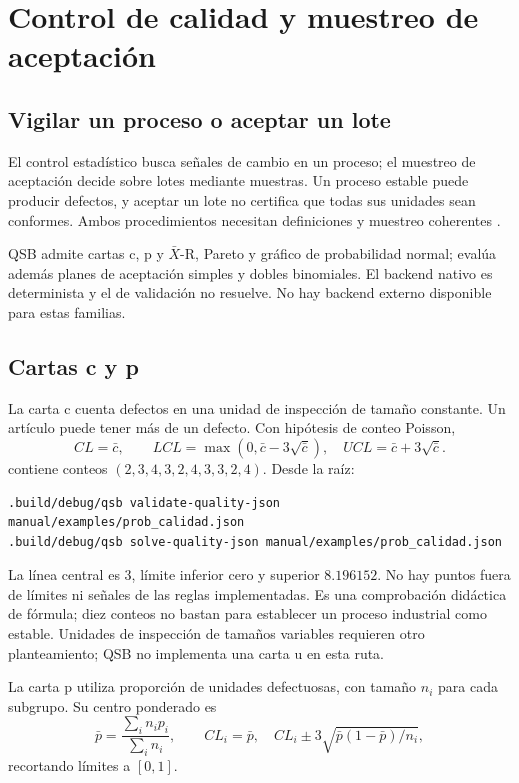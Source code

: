 \chapter{Control de calidad y muestreo de aceptación}
\label{ch:calidad}

\section{Vigilar un proceso o aceptar un lote}
El control estadístico busca señales de cambio en un proceso; el muestreo de
aceptación decide sobre lotes mediante muestras. Un proceso estable puede
producir defectos, y aceptar un lote no certifica que todas sus unidades sean
conformes. Ambos procedimientos necesitan definiciones y muestreo coherentes
\cite{montgomery2020quality}.

QSB admite cartas c, p y \(\bar X\)-R, Pareto y gráfico de probabilidad
normal; evalúa además planes de aceptación simples y dobles binomiales.
El backend nativo es determinista y el de validación no resuelve. No hay
backend externo disponible para estas familias.

\section{Cartas c y p}
La carta c cuenta defectos en una unidad de inspección de tamaño constante.
Un artículo puede tener más de un defecto. Con hipótesis de conteo Poisson,
\[
 CL=\bar c,\qquad LCL=\max(0,\bar c-3\sqrt{\bar c}),\quad
 UCL=\bar c+3\sqrt{\bar c}.
\]
 contiene conteos
\((2,3,4,3,2,4,3,3,2,4)\). Desde la raíz:
\begin{lstlisting}
.build/debug/qsb validate-quality-json manual/examples/prob_calidad.json
.build/debug/qsb solve-quality-json manual/examples/prob_calidad.json
\end{lstlisting}
La línea central es \(3\), límite inferior cero y superior \(8.196152\).
No hay puntos fuera de límites ni señales de las reglas implementadas. Es una
comprobación didáctica de fórmula; diez conteos no bastan para establecer un
proceso industrial como estable. Unidades de inspección de tamaños variables
requieren otro planteamiento; QSB no implementa una carta u en esta ruta.

La carta p utiliza proporción de unidades defectuosas, con tamaño \(n_i\)
para cada subgrupo. Su centro ponderado es
\[
 \bar p=\frac{\sum_i n_ip_i}{\sum_i n_i},\qquad
 CL_i=\bar p,\quad CL_i\pm3\sqrt{\bar p(1-\bar p)/n_i},
\]
recortando límites a \([0,1]\).

